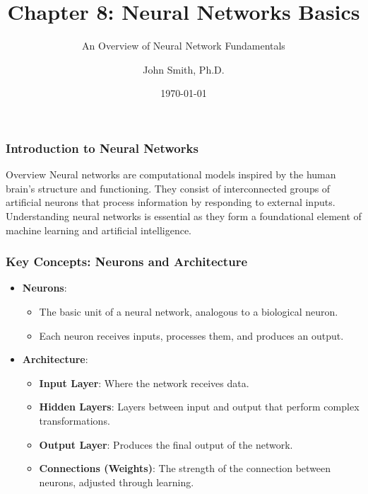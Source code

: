 \documentclass[aspectratio=169]{beamer}
\title[Neural Networks Basics]{Chapter 8: Neural Networks Basics}
\subtitle{An Overview of Neural Network Fundamentals}
\author[J. Smith]{John Smith, Ph.D.}
\institute[University Name]{
  Department of Computer Science\\
  University Name\\
  \vspace{0.3cm}
  Email: email@university.edu\\
  Website: www.university.edu
}
\date{\today}
\begin{document}
\frame{\titlepage}

\begin{frame}[fragile]
    \frametitle{Introduction to Neural Networks}
    \begin{block}{Overview}
        Neural networks are computational models inspired by the human brain's structure and functioning. 
        They consist of interconnected groups of artificial neurons that process information by responding to external inputs. 
        Understanding neural networks is essential as they form a foundational element of machine learning and artificial intelligence.
    \end{block}
\end{frame}

\begin{frame}[fragile]
    \frametitle{Key Concepts: Neurons and Architecture}
    \begin{itemize}
        \item \textbf{Neurons}:
            \begin{itemize}
                \item The basic unit of a neural network, analogous to a biological neuron.
                \item Each neuron receives inputs, processes them, and produces an output.
            \end{itemize}
        \item \textbf{Architecture}:
            \begin{itemize}
                \item \textbf{Input Layer}: Where the network receives data.
                \item \textbf{Hidden Layers}: Layers between input and output that perform complex transformations.
                \item \textbf{Output Layer}: Produces the final output of the network.
                \item \textbf{Connections (Weights)}: The strength of the connection between neurons, adjusted through learning.
            \end{itemize}
    \end{itemize}
\end{frame}
\end{document}
